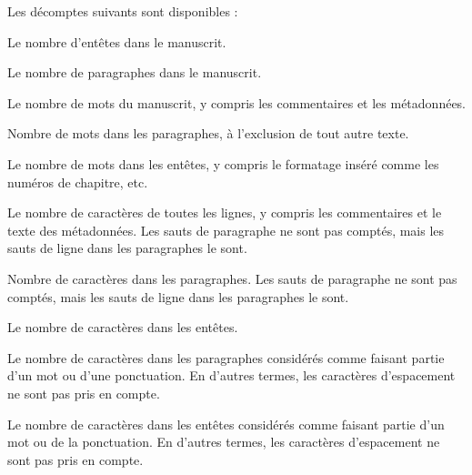 \documentclass[a4paper,11pt,french]{sphinxmanual}
\begin{document}
\sphinxAtStartPar
Les décomptes suivants sont disponibles :
\begin{description}
\sphinxAtStartPar
Le nombre d’en\sphinxhyphen{}têtes dans le manuscrit.

\sphinxAtStartPar
Le nombre de paragraphes dans le manuscrit.

\sphinxAtStartPar
Le nombre de mots du manuscrit, y compris les commentaires et les métadonnées.

\sphinxAtStartPar
Nombre de mots dans les paragraphes, à l’exclusion de tout autre texte.

\sphinxAtStartPar
Le nombre de mots dans les en\sphinxhyphen{}têtes, y compris le formatage inséré comme les numéros de chapitre, etc.

\sphinxAtStartPar
Le nombre de caractères de toutes les lignes, y compris les commentaires et le texte des métadonnées. Les sauts de paragraphe ne sont pas comptés, mais les sauts de ligne dans les paragraphes le sont.

\sphinxAtStartPar
Nombre de caractères dans les paragraphes. Les sauts de paragraphe ne sont pas comptés, mais les sauts de ligne dans les paragraphes le sont.

\sphinxAtStartPar
Le nombre de caractères dans les en\sphinxhyphen{}têtes.

\sphinxAtStartPar
Le nombre de caractères dans les paragraphes considérés comme faisant partie d’un mot ou d’une ponctuation. En d’autres termes, les caractères d’espacement ne sont pas pris en compte.

\sphinxAtStartPar
Le nombre de caractères dans les en\sphinxhyphen{}têtes considérés comme faisant partie d’un mot ou de la ponctuation. En d’autres termes, les caractères d’espacement ne sont pas pris en compte.

\end{description}
\end{document}

